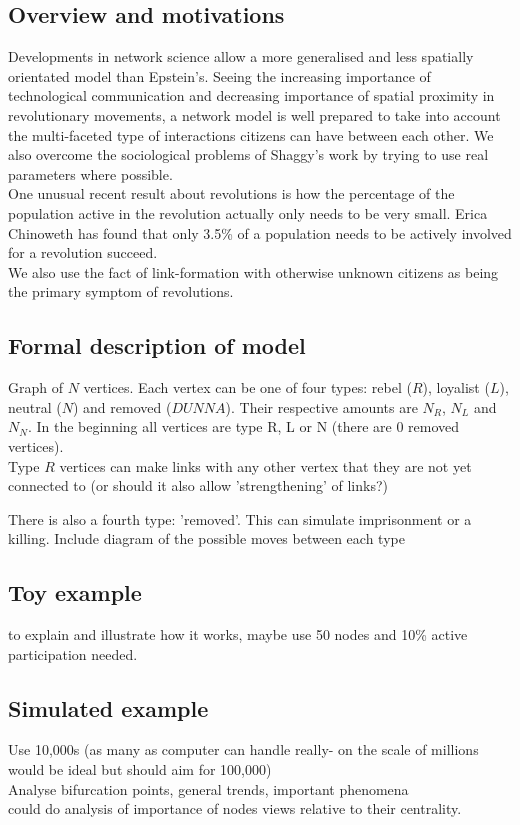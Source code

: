\subsection{Overview and motivations}
Developments in network science allow a more generalised and less spatially orientated model than Epstein's. Seeing the increasing importance of technological communication and decreasing importance of spatial proximity in revolutionary movements, a network model is well prepared to take into account the multi-faceted type of interactions citizens can have between each other. We also overcome the sociological problems of Shaggy's work by trying to use real parameters where possible.\\
One unusual recent result about revolutions is how the percentage of the population active in the revolution actually only needs to be very small. Erica Chinoweth has found that only 3.5\% of a population needs to be actively involved for a revolution succeed\cite{3.5}.\\
We also use the fact of link-formation with otherwise unknown citizens as being the primary symptom of revolutions.\\

\subsection{Formal description of model}
Graph of $N$ vertices. Each vertex can be one of four types: rebel ($R$), loyalist ($L$), neutral ($N$) and removed ($DUNNA$). Their respective amounts are $N_R$, $N_L$ and $N_N$. In the beginning all vertices are type R, L or N (there are 0 removed vertices). \\
Type $R$ vertices can make links with any other vertex that they are not yet connected to (or should it also allow 'strengthening' of links?)



There is also a fourth type: 'removed'. This can simulate imprisonment or a killing.
Include diagram of the possible moves between each type

\subsection{Toy example}
to explain and illustrate how it works, maybe use 50 nodes and 10\% active participation needed.

\subsection{Simulated example}
Use 10,000s (as many as computer can handle really- on the scale of millions would be ideal but should aim for 100,000)\\
Analyse bifurcation points, general trends, important phenomena\\
could do analysis of importance of nodes views relative to their centrality.